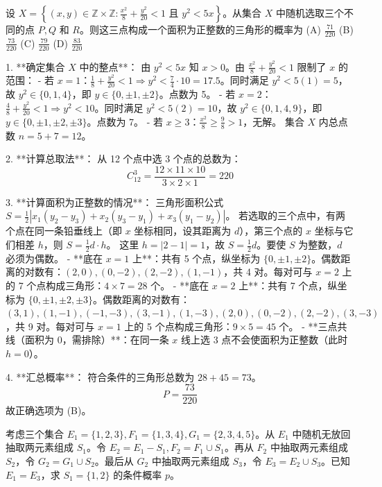 \begin{questions}
\question 设 $X = \left\{ (x, y) \in \mathbb{Z} \times \mathbb{Z} : \frac{x^2}{8} + \frac{y^2}{20} < 1 \text{ 且 } y^2 < 5x \right\}$。从集合 $X$ 中随机选取三个不同的点 $P, Q$ 和 $R$。则这三点构成一个面积为正整数的三角形的概率为
(A) $\frac{71}{220}$ \qquad (B) $\frac{73}{220}$ \qquad (C) $\frac{79}{220}$ \qquad (D) $\frac{83}{220}$

\begin{solution}
1. **确定集合 $X$ 中的整点**：
   由 $y^2 < 5x$ 知 $x > 0$。由 $\frac{x^2}{8} + \frac{y^2}{20} < 1$ 限制了 $x$ 的范围：
   - 若 $x=1$：$\frac{1}{8} + \frac{y^2}{20} < 1 \Rightarrow y^2 < \frac{7}{4} \cdot 10 = 17.5$。同时满足 $y^2 < 5(1) = 5$，故 $y^2 \in \{0, 1, 4\}$，即 $y \in \{0, \pm 1, \pm 2\}$。点数为 5。
   - 若 $x=2$：$\frac{4}{8} + \frac{y^2}{20} < 1 \Rightarrow y^2 < 10$。同时满足 $y^2 < 5(2) = 10$，故 $y^2 \in \{0, 1, 4, 9\}$，即 $y \in \{0, \pm 1, \pm 2, \pm 3\}$。点数为 7。
   - 若 $x \ge 3$：$\frac{x^2}{8} \ge \frac{9}{8} > 1$，无解。
   集合 $X$ 内总点数 $n = 5 + 7 = 12$。

2. **计算总取法**：
   从 12 个点中选 3 个点的总数为：
   \[
   C_{12}^3 = \frac{12 \times 11 \times 10}{3 \times 2 \times 1} = 220
   \]

3. **计算面积为正整数的情况**：
   三角形面积公式 $S = \frac{1}{2} |x_1(y_2-y_3) + x_2(y_3-y_1) + x_3(y_1-y_2)|$。
   若选取的三个点中，有两个点在同一条铅垂线上（即 $x$ 坐标相同，设其距离为 $d$），第三个点的 $x$ 坐标与它们相差 $h$，则 $S = \frac{1}{2} d \cdot h$。
   这里 $h = |2 - 1| = 1$，故 $S = \frac{1}{2} d$。要使 $S$ 为整数，$d$ 必须为偶数。
   - **底在 $x=1$ 上**：共有 5 个点，纵坐标为 $\{0, \pm 1, \pm 2\}$。偶数距离的对数有：$(2,0), (0,-2), (2,-2), (1,-1)$，共 4 对。每对可与 $x=2$ 上的 7 个点构成三角形：$4 \times 7 = 28$ 个。
   - **底在 $x=2$ 上**：共有 7 个点，纵坐标为 $\{0, \pm 1, \pm 2, \pm 3\}$。偶数距离的对数有：$(3,1), (1,-1), (-1,-3), (3,-1), (1,-3), (2,0), (0,-2), (2,-2), (3,-3)$，共 9 对。每对可与 $x=1$ 上的 5 个点构成三角形：$9 \times 5 = 45$ 个。
   - **三点共线（面积为 0，需排除）**：在同一条 $x$ 线上选 3 点不会使面积为正整数（此时 $h=0$）。

4. **汇总概率**：
   符合条件的三角形总数为 $28 + 45 = 73$。
   \[
   P = \frac{73}{220}
   \]
   故正确选项为 (B)。
\end{solution}

\question
考虑三个集合 $E_1=\{1,2,3\}, F_1=\{1,3,4\}, G_1=\{2,3,4,5\}$。从 $E_1$ 中随机无放回抽取两元素组成 $S_1$。令 $E_2=E_1-S_1, F_2=F_1 \cup S_1$。再从 $F_2$ 中抽取两元素组成 $S_2$，令 $G_2=G_1 \cup S_2$。最后从 $G_2$ 中抽取两元素组成 $S_3$，令 $E_3=E_2 \cup S_3$。已知 $E_1=E_3$，求 $S_1=\{1,2\}$ 的条件概率 $p$。


\end{questions}
